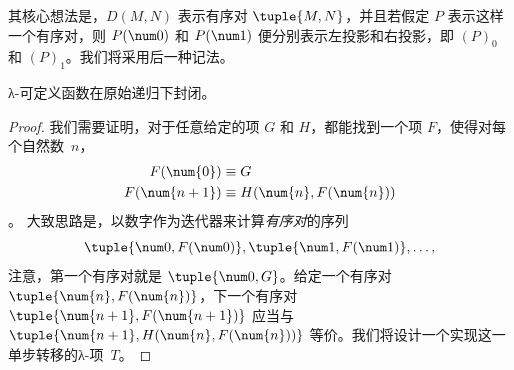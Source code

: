\documentclass[../../../include/open-logic-section]{subfiles}
\begin{document}
其核心想法是，$D(M,N)$ 表示有序对 $\tuple{M, N}$，并且若假定 $P$ 表示这样一个有序对，则 $P(\num 0)$ 和 $P(\num 1)$ 便分别表示左投影和右投影，即 $(P)_0$ 和 $(P)_1$。我们将采用后一种记法。

\begin{lem}
λ-可定义函数在原始递归下封闭。
\end{lem}

\begin{proof}
我们需要证明，对于任意给定的项 $G$ 和 $H$，都能找到一个项 $F$，使得对每个自然数~$n$，
\begin{align*}
F(\num{0}) & \equiv G \\
F(\num{n+1}) & \equiv H(\num{n}, F(\num{n}))
\end{align*}。
大致思路是，以数字作为迭代器来计算\emph{有序对}的序列
\[
\tuple{\num 0, F(\num 0)}, \tuple{\num 1, F(\num 1)}, \dots,
\]
注意，第一个有序对就是 $\tuple{\num 0, G}$。给定一个有序对 $\tuple{\num{n}, F(\num{n})}$，下一个有序对 $\tuple{\num{n+1}, F(\num{n+1})}$ 应当与 $\tuple{\num{n+1}, H(\num{n}, F(\num{n}))}$ 等价。我们将设计一个实现这一单步转移的λ-项~$T$。


\end{proof}
\end{document}
